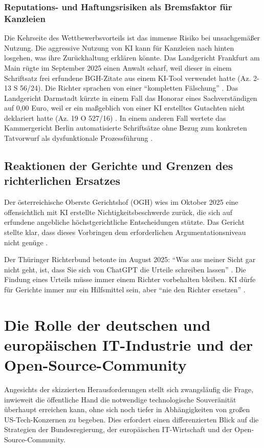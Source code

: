 \documentclass[12pt,a4paper]{article}
\begin{document}
	\subsubsection{Reputations- und Haftungsrisiken als Bremsfaktor für Kanzleien}
	Die Kehrseite des Wettbewerbsvorteils ist das immense Risiko bei unsachgemäßer Nutzung. Die aggressive Nutzung von KI kann für Kanzleien nach hinten losgehen, was ihre Zurückhaltung erklären könnte. Das Landgericht Frankfurt am Main rügte im September 2025 einen Anwalt scharf, weil dieser in einem Schriftsatz frei erfundene BGH-Zitate aus einem KI-Tool verwendet hatte (Az. 2-13 S 56/24). Die Richter sprachen von einer \enquote{kompletten Fälschung} \cite{LG Frankfurt2025}. Das Landgericht Darmstadt kürzte in einem Fall das Honorar eines Sachverständigen auf 0,00 Euro, weil er ein maßgeblich von einer KI erstelltes Gutachten nicht deklariert hatte (Az. 19 O 527/16) \cite{Kramarz2026}. In einem anderen Fall wertete das Kammergericht Berlin automatisierte Schriftsätze ohne Bezug zum konkreten Tatvorwurf als dysfunktionale Prozessführung \cite{KG Berlin2025}.
	
	\subsection{Reaktionen der Gerichte und Grenzen des richterlichen Ersatzes}
	
	Der österreichische Oberste Gerichtshof (OGH) wies im Oktober 2025 eine offensichtlich mit KI erstellte Nichtigkeitsbeschwerde zurück, die sich auf erfundene angebliche höchstgerichtliche Entscheidungen stützte. Das Gericht stellte klar, dass dieses Vorbringen dem erforderlichen Argumentationsniveau nicht genüge \cite{OGH2025}.
	
	Der Thüringer Richterbund betonte im August 2025: \enquote{Was aus meiner Sicht gar nicht geht, ist, dass Sie sich von ChatGPT die Urteile schreiben lassen} \cite{Richterbund2025}. Die Findung eines Urteils müsse immer einem Richter vorbehalten bleiben. KI dürfe für Gerichte immer nur ein Hilfsmittel sein, aber \enquote{nie den Richter ersetzen} \cite{Richterbund2025}.
	
	\section{Die Rolle der deutschen und europäischen IT-Industrie und der Open-Source-Community}
	
	Angesichts der skizzierten Herausforderungen stellt sich zwangsläufig die Frage, inwieweit die öffentliche Hand die notwendige technologische Souveränität überhaupt erreichen kann, ohne sich noch tiefer in Abhängigkeiten von großen US-Tech-Konzernen zu begeben. Dies erfordert einen differenzierten Blick auf die Strategien der Bundesregierung, der europäischen IT-Wirtschaft und der Open-Source-Community.
	
\end{document}
